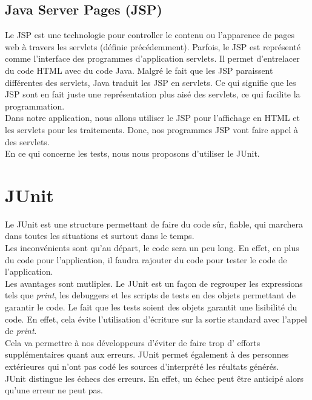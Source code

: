 \subsection{Java Server Pages (JSP)}
Le JSP est une technologie pour controller le contenu ou l'apparence de pages web {\`a} travers les servlets (d{\'e}finie pr{\'e}c{\'e}demment). Parfois, le JSP est repr{\'e}sent{\'e} comme l'interface des programmes d'application servlets.
Il permet d'entrelacer du code HTML avec du code Java.
Malgr{\'e} le fait que les JSP paraissent diff{\'e}rentes des servlets, Java
traduit les JSP en servlets. Ce qui signifie que les JSP sont en fait
juste une repr{\'e}sentation plus ais{\'e} des servlets, ce qui facilite la programmation.\\

Dans notre application, nous allons utiliser le JSP pour l'affichage en
HTML et les servlets pour les traitements. Donc, nos programmes JSP
vont faire appel {\`a} des servlets.\\

En ce qui concerne les tests, nous nous proposons d'utiliser le JUnit.\\

\section{JUnit}
Le JUnit est une structure permettant de faire du code s{\^u}r, fiable,
qui marchera dans toutes les situations et surtout dans le temps.\\

Les inconv{\'e}nients sont qu'au d{\'e}part, le code sera un peu long. En
effet, en plus du code pour l'application, il faudra rajouter du code
pour tester le code de l'application.\\

Les avantages sont mutliples.
Le JUnit est un fa{\c c}on de regrouper les expressions tels que {\it
print}, les debuggers et les scripts de tests en des objets permettant
de garantir le code. Le fait que les tests soient des objets garantit
une lisibilit{\'e} du code. En effet, cela {\'e}vite l'utilisation d'{\'e}criture
sur la sortie standard avec l'appel de {\it print}.\\
Cela va permettre {\`a} nos d{\'e}veloppeurs d'{\'e}viter de faire trop d' efforts suppl{\'e}mentaires quant aux erreurs.
JUnit permet {\'e}galement {\`a} des personnes ext{\'e}rieures qui n'ont pas cod{\'e}
les sources d'interpr{\'e}t{\'e} les r{\'e}ultats g{\'e}n{\'e}r{\'e}s.\\
JUnit distingue les {\'e}checs des erreurs. En effet, un {\'e}chec peut {\^e}tre anticip{\'e} alors qu'une erreur ne peut pas.\\

